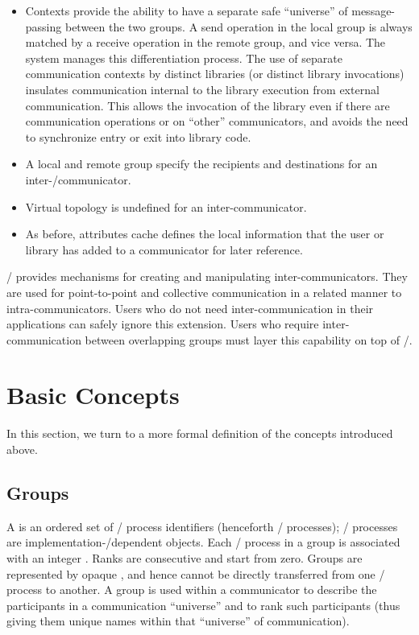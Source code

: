 \begin{itemize}
\item Contexts provide the ability to have
a separate safe ``universe''
of message-passing between the two groups. A send operation in the local
group is always matched by a receive operation in the remote group, and vice versa.
The system manages this differentiation process.
The use of separate communication
contexts by distinct libraries (or distinct library invocations)
insulates communication internal to the library execution from
external communication. This allows the invocation of the library even if
there are  communication operations
or 
on ``other'' communicators, and avoids the need to
synchronize entry or exit into library
code.

\item A local and remote group specify the recipients and destinations
for an inter\hyphen/communicator.

\item Virtual topology is undefined for an inter-communicator.

\item As before,
attributes cache defines the local information that the user or
library has added to a communicator for later reference.
\end{itemize}

\MPI/ provides mechanisms for creating and manipulating inter-communicators.
They are used for point-to-point
and collective
communication in a related manner to
intra-communicators. Users who do not need inter-communication
in their applications can safely ignore this extension. 
Users
who require inter-communication between overlapping groups
must layer
this capability on top of \MPI/.

\section{Basic Concepts}
\label{sec:context:basic}
In this section, we turn to a more formal definition of the
concepts introduced above.

\subsection{Groups}
\label{sec:context:groups}
A  is an ordered set of \MPI/ process identifiers (henceforth
\MPI/ processes); \MPI/ processes are
implementation\hyphen/dependent
objects. Each
\MPI/ process in a group is associated with an integer . Ranks are
consecutive and start from zero.
Groups are represented by opaque , and hence cannot
be directly transferred from one \MPI/ process to another. A group is used
within a communicator to describe the participants in a communication
``universe'' and to rank such participants (thus giving them unique names
within that ``universe'' of communication).

